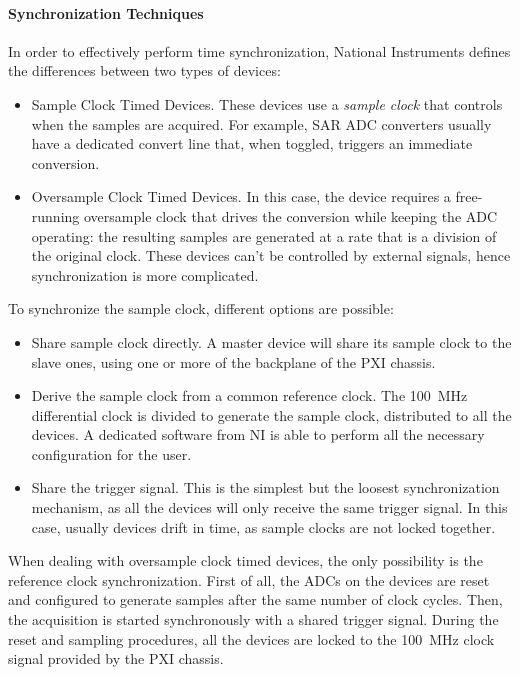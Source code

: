 \paragraph{Synchronization Techniques} In order to effectively perform time synchronization, National Instruments defines the differences between two types of devices:
\begin{itemize}
    \item Sample Clock Timed Devices. These devices use a \textit{sample clock} that controls when the samples are acquired. For example, SAR ADC converters usually have a dedicated convert line that, when toggled, triggers an immediate conversion.
    \item Oversample Clock Timed Devices. In this case, the device requires a free-running oversample clock that drives the conversion while keeping the ADC operating: the resulting samples are generated at a rate that is a division of the original clock. These devices can't be controlled by external signals, hence synchronization is more complicated.
\end{itemize}

To synchronize the sample clock, different options are possible:
\begin{itemize}
    \item Share sample clock directly. A master device will share its sample clock to the slave ones, using one or more of the backplane of the PXI chassis.
    \item Derive the sample clock from a common reference clock. The 100~MHz differential clock is divided to generate the sample clock, distributed to all the devices. A dedicated software from NI is able to perform all the necessary configuration for the user.
    \item Share the trigger signal. This is the simplest but the loosest synchronization mechanism, as all the devices will only receive the same trigger signal. In this case, usually devices drift in time, as sample clocks are not locked together. 
\end{itemize}

When dealing with oversample clock timed devices, the only possibility is the reference clock synchronization. First of all, the ADCs on the devices are reset and configured to generate samples after the same number of clock cycles. Then, the acquisition is started synchronously with a shared trigger signal. During the reset and sampling procedures, all the devices are locked to the 100~MHz clock signal provided by the PXI chassis. 


